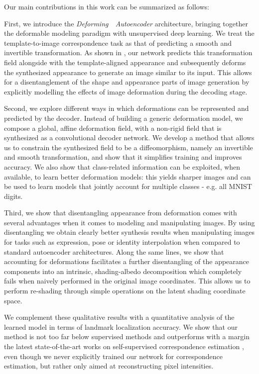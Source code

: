 \documentclass[runningheads]{llncs}
\begin{document}
Our main contributions in this work can be summarized as follows:

\newcommand{\dae}{Deforming~~Autoencoder}
First, we introduce the {\em{\dae}} architecture, bringing together the deformable modeling paradigm with unsupervised deep learning. We treat the template-to-image correspondence task as that of predicting a smooth and invertible transformation. As shown in , our network predicts this transformation field  alongside with the template-aligned appearance and subsequently deforms the synthesized appearance to generate an image similar  to its input. This allows for a disentanglement of the shape and appearance parts of image generation by explicitly modelling the effects of image deformation during the decoding stage.

Second, we explore different ways in which deformations can be represented and predicted by the decoder. 
Instead of building a generic deformation model, 
we compose a global, affine deformation field, with a non-rigid field that is synthesized as a convolutional decoder network. 
We develop a method that allows us to 
constrain the synthesized field to be a diffeomorphism, namely an invertible and smooth transformation, and show that it  simplifies training and improves accuracy. 
We also show that class-related information can be exploited, when available, to learn better deformation models: this yields sharper images and can be used to learn models that jointly account for multiple classes - e.g. all MNIST digits.  

Third, we show that disentangling appearance from deformation comes with several advantages when it comes to modeling and manipulating  images. By using disentangling we obtain  
clearly better synthesis results when manipulating images for tasks such as expression, pose or identity interpolation  when compared to standard  autoencoder architectures.
Along the same lines, we show that accounting for deformations facilitates a further  disentangling of the appearance components into an intrinsic, shading-albedo decomposition which completely fails when naively performed in the original image coordinates. This allows us to perform re-shading through simple operations on the latent shading coordinate space.

We complement these qualitative results with a quantitative analysis of the learned model in terms of  landmark localization accuracy. We show that our method is not too far below supervised methods and outperforms with a margin the latest state-of-the-art works on self-supervised correspondence estimation \cite{ThewlisBV17a}, even though we never explicitly trained our network for correspondence estimation, but rather only aimed at reconstructing pixel intensities.  
\end{document}
